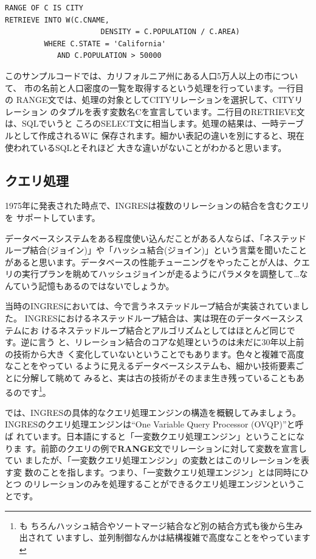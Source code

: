 \begin{center}
 \begin{minipage}{0.8\textwidth}
  \begin{lstlisting}
RANGE OF C IS CITY
RETRIEVE INTO W(C.CNAME,
                      DENSITY = C.POPULATION / C.AREA)
         WHERE C.STATE = 'California'
            AND C.POPULATION > 50000
  \end{lstlisting}
 \end{minipage}
\end{center}

このサンプルコードでは、カリフォルニア州にある人口5万人以上の市について、
市の名前と人口密度の一覧を取得するという処理を行っています。一行目の
RANGE文では、処理の対象としてCITYリレーションを選択して、CITYリレーション
のタプルを表す変数名Cを宣言しています。二行目のRETRIEVE文は、SQLでいうと
ころのSELECT文に相当します。処理の結果は、一時テーブルとして作成されるWに
保存されます。細かい表記の違いを別にすると、現在使われているSQLとそれほど
大きな違いがないことがわかると思います。


\subsection{クエリ処理}


1975年に発表された時点で、INGRESは複数のリレーションの結合を含むクエリを
サポートしています。


データベースシステムをある程度使い込んだことがある人ならば、「ネステッド
ループ結合(ジョイン)」や「ハッシュ結合(ジョイン)」という言葉を聞いたこと
があると思います。データベースの性能チューニングをやったことが人は、クエ
リの実行プランを眺めてハッシュジョインが走るようにパラメタを調整して…な
んていう記憶もあるのではないでしょうか。


当時のINGRESにおいては、今で言うネステッドループ結合が実装されていました。
INGRESにおけるネステッドループ結合は、実は現在のデータベースシステムにお
けるネステッドループ結合とアルゴリズムとしてはほとんど同じです。逆に言う
と、リレーション結合のコアな処理というのは未だに30年以上前の技術から大き
く変化していないということでもあります。色々と複雑で高度なことをやってい
るように見えるデータベースシステムも、細かい技術要素ごとに分解して眺めて
みると、実は古の技術がそのまま生き残っていることもあるのです\footnote{も
ちろんハッシュ結合やソートマージ結合など別の結合方式も後から生み出されて
いますし、並列制御なんかは結構複雑で高度なことをやっています}。


では、INGRESの具体的なクエリ処理エンジンの構造を概観してみましょう。
INGRESのクエリ処理エンジンは``One Variable Query Processor (OVQP)''と呼ば
れています。日本語にすると「一変数クエリ処理エンジン」ということになりま
す。前節のクエリの例で{\bf RANGE}文でリレーションに対して変数を宣言してい
ましたが、「一変数クエリ処理エンジン」の変数とはこのリレーションを表す変
数のことを指します。つまり、「一変数クエリ処理エンジン」とは同時にひとつ
のリレーションのみを処理することができるクエリ処理エンジンということです。

